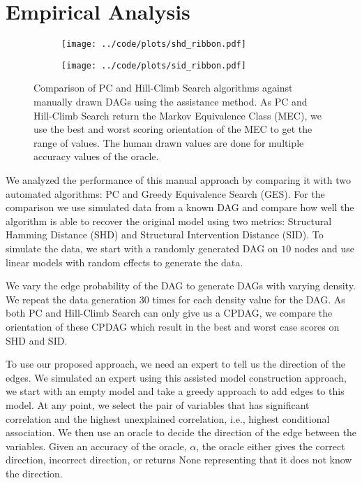 \documentclass[letterpaper]{article} %
\begin{document}
\section{Empirical Analysis}
\label{sec:empirical}

\begin{figure}
	\begin{subfigure}{0.5\textwidth}
		\centering
		\texttt{[image: ../code/plots/shd\_ribbon.pdf]}
		\caption{}
	\end{subfigure}
	\begin{subfigure}{0.5\textwidth}
		\centering
		\texttt{[image: ../code/plots/sid\_ribbon.pdf]}
		\caption{}
	\end{subfigure}
	\caption{Comparison of PC and Hill-Climb Search algorithms against
		manually drawn DAGs using the assistance method. As PC and
		Hill-Climb Search return the Markov Equivalence Class (MEC), we
		use the best and worst scoring orientation of the MEC to get
		the range of values. The human drawn values are done for
	multiple accuracy values of the oracle. }
\end{figure}

We analyzed the performance of this manual approach by comparing it with two
automated algorithms: PC and Greedy Equivalence Search (GES). For the
comparison we use simulated data from a known DAG and compare how well the
algorithm is able to recover the original model using two metrics: Structural
Hamming Distance (SHD) and Structural Intervention Distance (SID). To simulate
the data, we start with a randomly generated DAG on $ 10 $ nodes and use linear
models with random effects to generate the data. 

We vary the edge probability of the DAG to generate DAGs with varying density.
We repeat the data generation $ 30 $ times for each density value for the DAG.
As both PC and Hill-Climb Search can only give us a CPDAG, we compare the
orientation of these CPDAG which result in the best and worst case scores on
SHD and SID.

To use our proposed approach, we need an expert to tell us the direction of the
edges. We simulated an expert using this assisted model construction approach,
we start with an empty model and take a greedy approach to add edges to this
model. At any point, we select the pair of variables that has significant
correlation and the highest unexplained correlation, i.e., highest conditional
association. We then use an oracle to decide the direction of the edge between
the variables. Given an accuracy of the oracle, $ \alpha $, the oracle either
gives the correct direction, incorrect direction, or returns None representing
that it does not know the direction.
\end{document}
